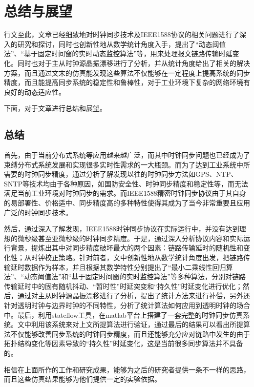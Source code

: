 
\chapter{总结与展望}
行文至此，文章已经细致地对时钟同步技术及IEEE1588协议的相关问题进行了深入的研究和探讨，同时也创新性地从数学统计角度入手，提出了“动态阈值法”、“基于固定时间窗的实时动态监控算法”等，用来处理报文链路传输时延变化。同时也对于主从时钟源晶振漂移进行了分析，并从统计角度给出了相关的解决方案，而且通过文末的仿真能发现这些算法不仅能够在一定程度上提高系统的同步精度，而且能提高同步系统的稳定性和鲁棒性，对于工业环境下复杂的网络环境有良好的动态适应性。

下面，对于文章进行总结和展望。

\section{总结}
首先，由于当前分布式系统等应用越来越广泛，而其中时钟同步问题也已经成为了束缚分布式系统发展和实现很多实时性需求的一大瓶颈。而为了达到工业系统中所需要的时钟同步精度，通过分析了解发现以往的时钟同步方法如GPS、NTP、SNTP等技术均由于各种原因，如国防安全性、时钟同步精度和稳定性等，而无法满足当前工业环境对时钟同步的需求。而IEEE1588精密时钟同步协议由于其自身的易部署性、价格适中、同步精度高的多种特性使得其成为了当今非常重要且应用广泛的时钟同步技术。

然后，通过深入了解发现，IEEE1588时钟同步协议在实际运行中，并没有达到理想的微秒级甚至亚微秒级的时钟同步精度。于是，通过深入分析协议内容和实际运行背景，提炼出其中对同步精度破坏最大的两个因素：链路传输延时的随机性和变化性；从时钟校正策略。针对前者，文中创新性地从数学统计角度出发，把链路传输延时数据作为样本，并且根据其数学特性分别提出了“最小二乘线性回归算法”、“动态阈值法”和“基于固定时间窗的实时监控算法”等多种算法，分别对链路传输延时中的固有随机抖动、“暂时性”时延突变和“持久性”时延变化进行优化；然后，通过对主从时钟源晶振漂移进行了分析，提出了统计方法来进行补偿，另外还针对透明时钟与边界时钟的不同特性，分析了统计算法如何应用到透明时钟的场合中。最后，利用stateflow工具，在matlab平台上搭建了一套完整的时钟同步仿真系统。文中利用该系统来对上文所提算法进行验证，通过最后的结果可以看出所提算法不仅能够改善同步系统的时钟同步精度，而且还能够充分应对链路中发生的由于拓扑结构变化等因素导致的“持久性”时延变化，这是当前很多同步算法并不具备的。

相信在上面所作的工作和研究成果，能够为之后的研究者提供一条不一样的思路，而且这些仿真结果能够为他们提供一定的实验依据。 

